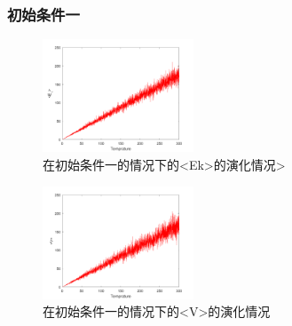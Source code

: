\documentclass[UTF8,a4paper,10pt]{ctexart}
\begin{document}
\subsubsection{初始条件一}
	\begin{figure}[!htbp]
		\centering
		\includegraphics[width=0.4\textwidth,height=0.3\textwidth]{pictures/ek1.png}
		\caption{在初始条件一的情况下的<Ek>的演化情况>} \label{ek1}
	\end{figure}
	\begin{figure}[!htbp]
		\centering
		\includegraphics[width=0.4\textwidth,height=0.3\textwidth]{pictures/v1.png}
		\caption{在初始条件一的情况下的<V>的演化情况} \label{v1}
	\end{figure}
\end{document}
